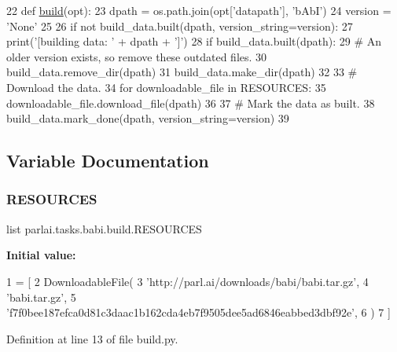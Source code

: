 \begin{DoxyCode}
22 \textcolor{keyword}{def }\hyperlink{namespacedialog__babi__feedback_1_1build_a7a9d289f7493a5ded13c4b7f071b6184}{build}(opt):
23     dpath = os.path.join(opt[\textcolor{stringliteral}{'datapath'}], \textcolor{stringliteral}{'bAbI'})
24     version = \textcolor{stringliteral}{'None'}
25 
26     \textcolor{keywordflow}{if} \textcolor{keywordflow}{not} build\_data.built(dpath, version\_string=version):
27         print(\textcolor{stringliteral}{'[building data: '} + dpath + \textcolor{stringliteral}{']'})
28         \textcolor{keywordflow}{if} build\_data.built(dpath):
29             \textcolor{comment}{# An older version exists, so remove these outdated files.}
30             build\_data.remove\_dir(dpath)
31         build\_data.make\_dir(dpath)
32 
33         \textcolor{comment}{# Download the data.}
34         \textcolor{keywordflow}{for} downloadable\_file \textcolor{keywordflow}{in} RESOURCES:
35             downloadable\_file.download\_file(dpath)
36 
37         \textcolor{comment}{# Mark the data as built.}
38         build\_data.mark\_done(dpath, version\_string=version)
39 \end{DoxyCode}


\subsection{Variable Documentation}
\mbox{\label{namespaceparlai_1_1tasks_1_1babi_1_1build_ad43c8fefdd636b159033010bba7395f1}} 
\subsubsection{\texorpdfstring{R\+E\+S\+O\+U\+R\+C\+ES}{RESOURCES}}
{\footnotesize\ttfamily list parlai.\+tasks.\+babi.\+build.\+R\+E\+S\+O\+U\+R\+C\+ES}

{\bfseries Initial value\+:}
\begin{DoxyCode}
1 =  [
2     DownloadableFile(
3         \textcolor{stringliteral}{'http://parl.ai/downloads/babi/babi.tar.gz'},
4         \textcolor{stringliteral}{'babi.tar.gz'},
5         \textcolor{stringliteral}{'f7f0bee187efca0d81c3daac1b162cda4eb7f9505dee5ad6846eabbed3dbf92e'},
6     )
7 ]
\end{DoxyCode}


Definition at line 13 of file build.\+py.

